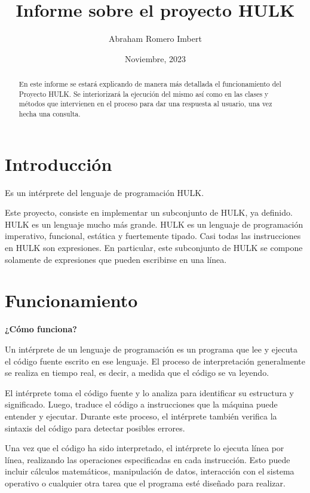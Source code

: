 \documentclass[a4paper,12pt]{article}
\begin{document}
\title{Informe sobre el proyecto HULK}
\author{Abraham Romero Imbert}

\date{Noviembre, 2023}
\maketitle
\begin{abstract}
En este informe se estará explicando de manera más detallada el funcionamiento del Proyecto HULK. Se interiorizará la ejecución del mismo así como en las clases y métodos que intervienen en el proceso para dar una respuesta al usuario, una vez hecha una consulta.
\end{abstract}
\section{Introducción}\label{sec:intro}
Es un intérprete del lenguaje de programación HULK.

Este proyecto, consiste en implementar un subconjunto de HULK, ya definido. HULK es un lenguaje mucho más grande.
HULK es un lenguaje de programación imperativo, funcional, estática y fuertemente tipado. Casi todas las instrucciones en HULK son expresiones. En particular, este subconjunto de HULK se compone solamente de expresiones que pueden escribirse en una línea.

\section{Funcionamiento}
\begin{center}
    \LARGE\textbf{¿Cómo funciona?}
  \end{center}
  Un intérprete de un lenguaje de programación es un programa que lee y ejecuta el código fuente escrito en ese lenguaje. El proceso de interpretación generalmente se realiza en tiempo real, es decir, a medida que el código se va leyendo.
  
  El intérprete toma el código fuente y lo analiza para identificar su estructura y significado. Luego, traduce el código a instrucciones que la máquina puede entender y ejecutar. Durante este proceso, el intérprete también verifica la sintaxis del código para detectar posibles errores.
  
  Una vez que el código ha sido interpretado, el intérprete lo ejecuta línea por línea, realizando las operaciones especificadas en cada instrucción. Esto puede incluir cálculos matemáticos, manipulación de datos, interacción con el sistema operativo o cualquier otra tarea que el programa esté diseñado para realizar.
  
\end{document}
